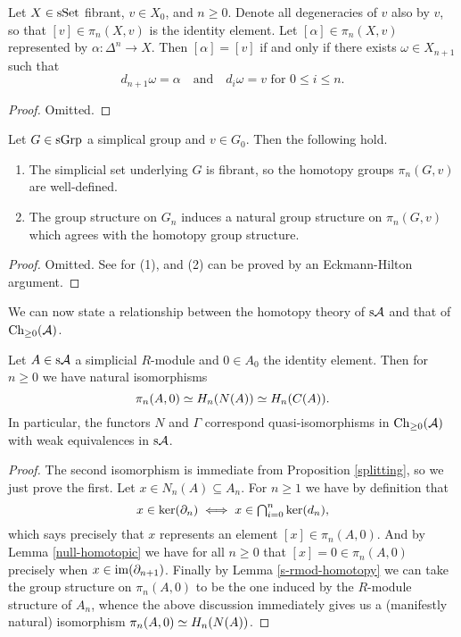 \begin{lemma}
  \label{null-homotopic}
  Let $X \in \mathrm{s}\mathrm{Set}$ fibrant, $v \in X_0$, and $n \ge 0$. Denote all
  degeneracies of $v$ also by $v$, so that $[v] \in \pi_n(X,v)$ is the
  identity element. Let $[\alpha] \in \pi_n(X,v)$ represented by
  $\alpha : \Delta^n \to X$. Then $[\alpha] = [v]$ if and only if
  there exists $\omega \in X_{n+1}$ such that
  \[
  d_{n+1}\omega = \alpha \quad\text{and}\quad d_i\omega = v\text{ for
  } 0 \le i \le n.
  \]
\end{lemma}

\begin{proof}
  Omitted.
\end{proof}

\begin{lemma}
  \label{s-rmod-homotopy}
  Let $G \in \mathrm{s}\mathrm{Grp}$ a simplical group and $v \in G_0$. Then the
  following hold.
  \begin{enumerate}
  \item The simplicial set underlying $G$ is fibrant, so the homotopy
    groups $\pi_n(G,v)$ are well-defined.
  \item The group structure on $G_n$ induces a natural group structure
    on $\pi_n(G,v)$ which agrees with the homotopy group structure.
  \end{enumerate}
\end{lemma}

\begin{proof}
  Omitted. See \cite{goerssjardine} for (1), and (2) can be proved by
  an Eckmann-Hilton argument.
\end{proof}

We can now state a relationship between the homotopy theory of $\mathrm{s}\mathcal{A}$
and that of $\mathrm{Ch}_{\ge 0}(\mathcal{A})$.

\begin{proposition}
  \label{homotopy-homology}
  Let $A \in \mathrm{s}\mathcal{A}$ a simplicial $R$-module and $0 \in A_0$ the
  identity element. Then for $n \ge 0$ we have natural isomorphisms
  \[
  \pi_n(A,0) \simeq H_n(N(A)) \simeq H_n(C(A)).
  \]
  In particular, the functors $N$ and $\Gamma$ correspond
  quasi-isomorphisms in $\mathrm{Ch}_{\ge 0}(\mathcal{A})$ with weak equivalences in
  $\mathrm{s}\mathcal{A}$.
\end{proposition}

\begin{proof}
  The second isomorphism is immediate from Proposition
  \ref{splitting}, so we just prove the first. Let $x \in N_n(A)
  \subseteq A_n$. For $n \ge 1$ we have by definition that
  \[
  \textstyle{x \in \ker(\partial_n) \iff x \in \bigcap_{i=0}^n \ker(d_n)},
  \]
  which says precisely that $x$ represents an element $[x] \in
  \pi_n(A,0)$. And by Lemma \ref{null-homotopic} we have for all $n
  \ge 0$ that $[x] = 0 \in \pi_n(A,0)$ precisely when $x \in
  \operatorname{im}(\partial_{n+1})$. Finally by Lemma \ref{s-rmod-homotopy} we can take
  the group structure on $\pi_n(A,0)$ to be the one induced by the
  $R$-module structure of $A_n$, whence the above discussion
  immediately gives us a (manifestly natural) isomorphism $\pi_n(A,0)
  \simeq H_n(N(A))$.
\end{proof}

